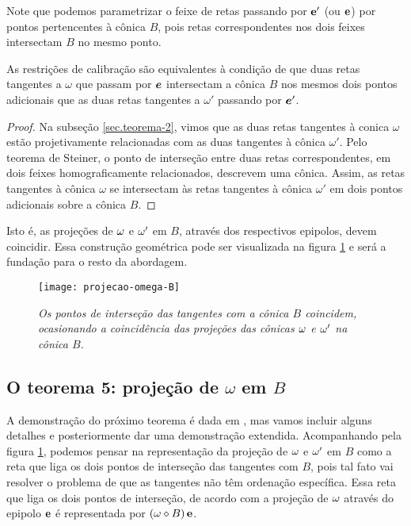 Note que podemos parametrizar o feixe de retas passando por ${\bf e'}$ (ou ${\bf e}$) por pontos pertencentes à cônica $B$, pois retas correspondentes nos dois feixes intersectam $B$ no mesmo ponto. 

\begin{teorema}
As restrições de calibração são equivalentes à condição de que duas retas tangentes a $\omega$ que passam por $\boldsymbol{e}$ intersectam a cônica $B$ nos mesmos dois pontos adicionais que as duas retas tangentes a $\omega'$ passando por $\boldsymbol{e}'$.
\end{teorema}

\begin{proof}
Na subseção \ref{sec.teorema-2}, vimos que as duas retas tangentes à conica $\omega$ estão projetivamente relacionadas com as duas tangentes à cônica $\omega'$. Pelo teorema de Steiner, o ponto de interseção entre duas retas correspondentes, em dois feixes homograficamente relacionados, descrevem uma cônica. Assim, as retas tangentes à cônica $\omega$ se intersectam às retas tangentes à cônica $\omega'$ em dois pontos adicionais sobre a cônica $B$. 
\end{proof}

Isto é, as projeções de ${\bf \omega}$ e ${\bf \omega'}$ em $B$, através dos respectivos epipolos, devem coincidir. Essa construção geométrica pode ser visualizada na figura \ref{omega-B} e será a fundação para o resto da abordagem. 

\begin{figure}[!htb]
\centering
\texttt{[image: projecao-omega-B]}
\caption{\textit{Os pontos de interseção das tangentes com a cônica $B$ coincidem, ocasionando a coincidência das projeções das cônicas ${\bf \omega}$ e ${\bf \omega'}$ na cônica $B$.}}
\label{omega-B}
\end{figure}

\subsection{O teorema 5: projeção de $\omega$ em $B$}\label{sec.teorema-5}

 A demonstração do próximo teorema é dada em \cite{2503343}, mas vamos incluir alguns detalhes e posteriormente dar uma demonstração extendida. Acompanhando pela figura \ref{omega-B}, podemos pensar na representação da projeção de  ${\bf \omega}$ e ${\bf \omega'}$ em $B$ como a reta que liga os dois pontos de interseção das tangentes com $B$, pois tal fato vai resolver o problema de que as tangentes não têm ordenação específica. Essa reta que liga os dois pontos de interseção, de acordo com a projeção de ${\bf \omega}$ através do epipolo ${\bf e}$ é representada por $({\bf \omega}\diamond B)\,{\bf e}$.

